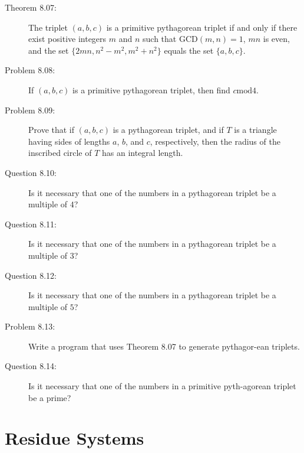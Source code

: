 \documentclass{article}
\begin{document}
\begin{description}
  \item[Theorem 8.07:] The triplet $(a,b,c)$ is a primitive pythagorean triplet if and only if there exist positive integers $m$ and $n$ such that $\text{GCD}(m,n) = 1$, $mn$ is even, and the set $\{ 2mn, n^2-m^2, m^2+n^2 \}$ equals the set $\{ a,b,c \}$.

  \item[Problem 8.08:] If $(a,b,c)$ is a primitive pythagorean triplet, then find $c \text{mod} 4$.

  \item[Problem 8.09:] Prove that if $(a,b,c)$ is a pythagorean triplet, and if $T$ is a triangle having sides of lengths $a$, $b$, and $c$, respectively, then the radius of the inscribed circle of $T$ has an integral length.

  \item[Question 8.10:] Is it necessary that one of the numbers in a pythagorean triplet be a multiple of $4$?

  \item[Question 8.11:] Is it necessary that one of the numbers in a pythagorean triplet be a multiple of $3$?

  \item[Question 8.12:] Is it necessary that one of the numbers in a pythagorean triplet be a multiple of $5$?

  \item[Problem 8.13:] Write a program that uses Theorem 8.07 to generate pythagor-ean triplets.

  \item[Question 8.14:] Is it necessary that one of the numbers in a primitive pyth-agorean triplet be a prime?

\end{description}


\section{Residue Systems}
\end{document}

